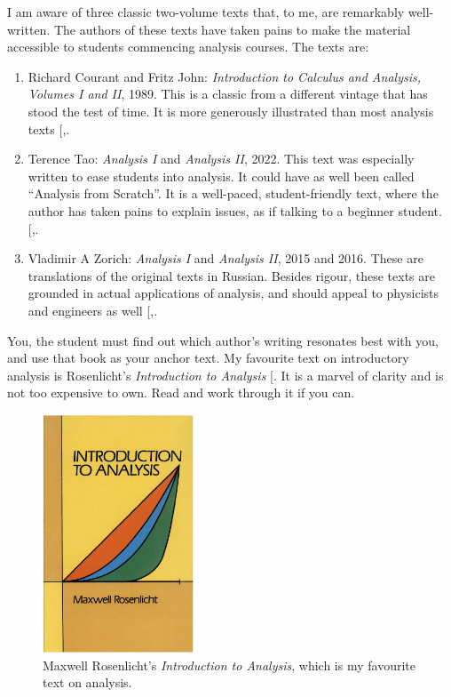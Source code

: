 \documentclass[
  a4paper,
]{article}
\begin{document}
I am aware of three classic two-volume texts that, to me, are remarkably
well-written. The authors of these texts have taken pains to make the
material accessible to students commencing analysis courses. The texts
are:

\begin{enumerate}
\def\labelenumi{\arabic{enumi}.}
\item
  Richard Courant and Fritz John: \emph{Introduction to Calculus and
  Analysis, Volumes I and II}, 1989. This is a classic from a different
  vintage that has stood the test of time. It is more generously
  illustrated than most analysis texts
  {[},\citeproc{ref-courant-john-two}{5}{]}.
\item
  Terence Tao: \emph{Analysis I} and \emph{Analysis II}, 2022. This text
  was especially written to ease students into analysis. It could have
  as well been called ``Analysis from Scratch''. It is a well-paced,
  student-friendly text, where the author has taken pains to explain
  issues, as if talking to a beginner student.
  {[},\citeproc{ref-tao-two-2022}{7}{]}.
\item
  Vladimir A Zorich: \emph{Analysis I} and \emph{Analysis II}, 2015 and
  2016. These are translations of the original texts in Russian. Besides
  rigour, these texts are grounded in actual applications of analysis,
  and should appeal to physicists and engineers as well
  {[},\citeproc{ref-zorich-two-2016}{9}{]}.
\end{enumerate}

You, the student must find out which author's writing resonates best
with you, and use that book as your anchor text. My favourite text on
introductory analysis is Rosenlicht's \emph{Introduction to Analysis}
{[}\citeproc{ref-rosenlicht1986}{10}{]}. It is a marvel of clarity and
is not too expensive to own. Read and work through it if you can.

\begin{figure}
\centering
\includegraphics[width=0.4\textwidth,height=\textheight]{images/rosenlicht.jpg}
\caption{Maxwell Rosenlicht's \emph{Introduction to Analysis}, which is
my favourite text on analysis.}\label{fig:rosenlicht}
\end{figure}
\end{document}
